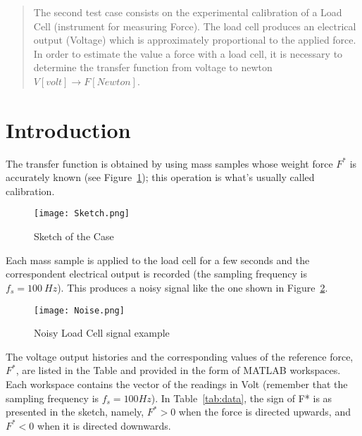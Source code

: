 \documentclass[12pt]{article}
\begin{document}
\maketitle

\begin{abstract}
        The second test case consists on the experimental calibration of a Load Cell (instrument for measuring Force). The load cell produces an electrical output (Voltage) which is approximately proportional to the applied force. In order to estimate the value a force with a load cell, it is necessary to determine the transfer function from voltage to newton \( V [volt] \rightarrow F [Newton] \). \cite{FL:02}
\end{abstract}

\section{Introduction}

        The transfer function is obtained by using mass samples whose weight force \( F^* \) is accurately known (see Figure~\ref{fig:sketch}); this operation is what's usually called calibration.

        \begin{figure}[!ht]
                \texttt{[image: Sketch.png]}
                \centering
                \caption{Sketch of the Case}
                \label{fig:sketch}
        \end{figure}

        Each mass sample is applied to the load cell for a few seconds and the correspondent electrical output is recorded (the sampling frequency is \( f_s=100 \: H\!z \)). This produces a noisy signal like the one shown in Figure~\ref{fig:noise}.

        \begin{figure}[!ht]
                \texttt{[image: Noise.png]}
                \centering
                \caption{Noisy Load Cell signal example}
                \label{fig:noise}
        \end{figure}

        The voltage output histories and the corresponding values of the reference force, \( F^* \), are listed in the Table and provided in the form of MATLAB workspaces. Each workspace contains the vector of the readings in Volt (remember that the sampling frequency is \( f_s = 100 H\!z \)). In Table~\ref{tab:data}, the sign of F* is as presented in the sketch, namely, \( F^* > 0 \) when the force is directed upwards, and \( F^* < 0 \) when it is directed downwards.
\end{document}
